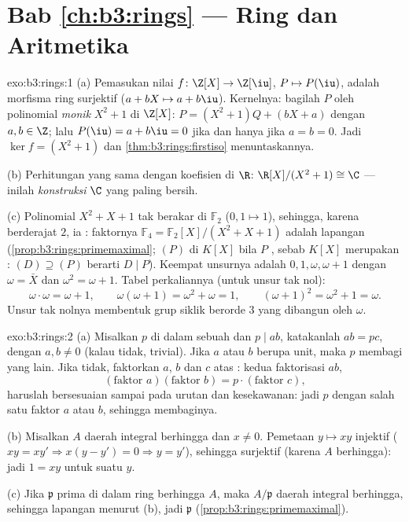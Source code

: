 \section*{Bab \ref{ch:b3:rings} --- Ring dan Aritmetika}

\begin{solution}{exo:b3:rings:1}
(a) Pemasukan nilai $f \colon \Z[X] \to \Z[\iu]$, $P \mapsto P(\iu)$,
adalah morfisma ring surjektif ($a + bX \mapsto a + b\iu$). Kernelnya:
bagilah $P$ oleh polinomial \emph{monik} $X^2 + 1$ di $\Z[X]$: $P = (X^2 +
1)Q + (bX + a)$ dengan $a, b \in \Z$; lalu $P(\iu) = a + b\iu = 0$
jika dan hanya jika $a = b = 0$. Jadi $\ker f = (X^2+1)$ dan
\cref{thm:b3:rings:firstiso} menuntaskannya.

(b) Perhitungan yang sama dengan koefisien di $\R$: $\R[X]/(X^2+1)
\cong \C$ --- inilah \emph{konstruksi} $\C$ yang paling bersih.

(c) Polinomial $X^2 + X + 1$ tak berakar di $\mathbb F_2$ ($0, 1 \mapsto 1$),
sehingga, karena berderajat $2$, ia : faktornya $\mathbb
F_4 = \mathbb F_2[X]/(X^2+X+1)$ adalah lapangan
(\cref{prop:b3:rings:primemaximal}; $(P)$  di $K[X]$ bila
$P$ , sebab $K[X]$ merupakan :  $(D) \supseteq
(P)$ berarti $D \mid P$). Keempat unsurnya adalah $0, 1, \omega,
\omega + 1$ dengan $\omega = \bar X$ dan $\omega^2 = \omega + 1$.
Tabel perkaliannya (untuk unsur tak nol):
\[
\omega \cdot \omega = \omega + 1, \qquad
\omega(\omega + 1) = \omega^2 + \omega = 1, \qquad
(\omega+1)^2 = \omega^2 + 1 = \omega .
\]
Unsur tak nolnya membentuk grup siklik berorde $3$ yang dibangun oleh
$\omega$.
\end{solution}

\begin{solution}{exo:b3:rings:2}
(a) Misalkan $p$  di dalam sebuah  dan $p \mid ab$, katakanlah $ab =
pc$, dengan $a, b \neq 0$ (kalau tidak, trivial). Jika $a$ atau $b$ berupa unit,
maka $p$ membagi yang lain. Jika tidak, faktorkan $a$, $b$ dan $c$ atas
: kedua faktorisasi $ab$,
\[
(\text{faktor } a)(\text{faktor } b) = p \cdot
(\text{faktor } c),
\]
haruslah bersesuaian sampai pada urutan dan kesekawanan: jadi $p$  dengan salah satu
faktor  $a$ atau $b$, sehingga membaginya.

(b) Misalkan $A$ daerah integral berhingga dan $x \neq 0$. Pemetaan $y \mapsto
xy$ injektif ($xy = xy' \Rightarrow x(y - y') = 0 \Rightarrow
y = y'$), sehingga surjektif (karena $A$ berhingga): jadi $1 = xy$ untuk suatu $y$.

(c) Jika $\mathfrak p$ prima di dalam ring berhingga $A$, maka
$A/\mathfrak p$ daerah integral berhingga, sehingga lapangan menurut (b), jadi
$\mathfrak p$  (\cref{prop:b3:rings:primemaximal}).
\end{solution}

